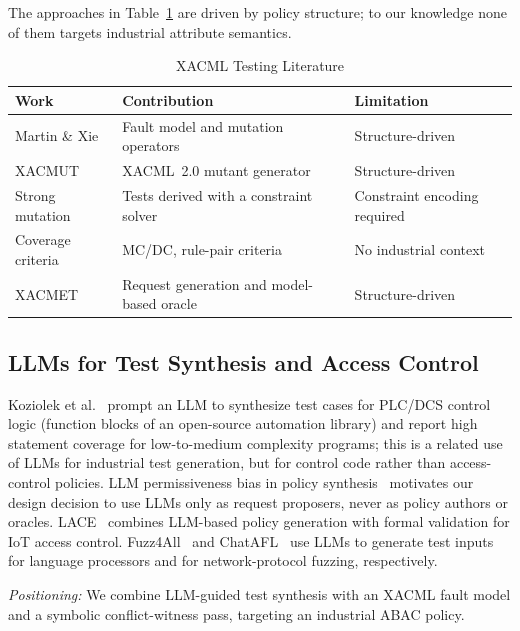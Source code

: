 \documentclass[conference]{IEEEtran}
\begin{document}
The approaches in Table~\ref{tab:related} are driven by policy structure;
to our knowledge none of them targets industrial attribute semantics.

\begin{table}[htbp]
\caption{XACML Testing Literature}
\label{tab:related}
\begin{center}
\begin{tabular}{|p{2.0cm}|p{2.5cm}|p{2.5cm}|}
\hline
\textbf{Work} & \textbf{Contribution} & \textbf{Limitation} \\
\hline
Martin \& Xie \cite{b1} & Fault model and mutation operators & Structure-driven \\
\hline
XACMUT \cite{b2} & XACML~2.0 mutant generator & Structure-driven \\
\hline
Strong mutation \cite{b3} & Tests derived with a constraint solver & Constraint encoding required \\
\hline
Coverage criteria \cite{b4} & MC/DC, rule-pair criteria & No industrial context \\
\hline
XACMET \cite{b5} & Request generation and model-based oracle & Structure-driven \\
\hline
\end{tabular}
\end{center}
\end{table}

\subsection{LLMs for Test Synthesis and Access Control}

Koziolek et al.~\cite{b11} prompt an LLM to synthesize test cases for PLC/DCS
control logic (function blocks of an open-source automation library) and
report high statement coverage for low-to-medium complexity programs; this is
a related use of LLMs for industrial test generation, but for control code
rather than access-control policies.
LLM permissiveness bias in policy synthesis~\cite{b12} motivates our design
decision to use LLMs only as request proposers, never as policy authors or
oracles. LACE~\cite{b13} combines LLM-based policy generation with formal validation
for IoT access control. Fuzz4All~\cite{b14} and ChatAFL~\cite{b15} use LLMs to
generate test inputs for language processors and for network-protocol
fuzzing, respectively.

\textit{Positioning:} We combine LLM-guided test synthesis with an XACML fault
model and a symbolic conflict-witness pass, targeting an industrial ABAC
policy.
\end{document}

